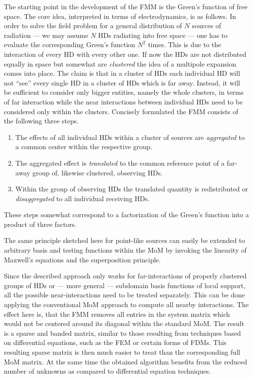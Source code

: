 The starting point in the development of the \ac{FMM} is the Green's function
of free space.
The core idea, interpreted in terms of electrodynamics, is as follows.
In order to solve the field problem for a general distribution of $N$ sources
of radiation --- we may assume $N$ \acp{HD} radiating into free space ---
one has to evaluate the corresponding Green's function $N^2$ times.
This is due to the interaction of every \ac{HD} with every other one.
If now the \acp{HD} are not distributed equally in space but somewhat are
\emph{clustered} the idea of a multipole expansion 
\cite[9.7]{Jackson2013} \cite[7.10]{vanBladel2007} comes into place.
The claim is that in a cluster of \acp{HD} each individual \ac{HD} will not
\enquote{see} every single \ac{HD} in a cluster of \acp{HD} which is far away.
Instead, it will be sufficient to consider only bigger entities, namely the
whole clusters, in terms of far interaction while the near interactions
between individual \acp{HD} need to be considered only within the clusters.
Concisely formulated the \ac{FMM} consists of the following three steps. 
\begin{enumerate}
	\item The effects of all individual \acp{HD} within a cluster of sources
	are \emph{aggregated} to a common center within the respective group. 
	\item The aggregated effect is \emph{translated} to the common reference
	point of a far-away group of, likewise clustered, observing \acp{HD}.
	\item Within the group of observing \acp{HD} the translated quantity is
	redistributed or \emph{disaggregated} to all individual receiving \acp{HD}.
\end{enumerate}

These steps somewhat correspond to a factorization of the Green's function
into a product of three factors.

The same principle sketched here for point-like sources can easily be extended
to arbitrary basis and testing functions within the \ac{MoM} by invoking
the linearity of Maxwell's equations and the superposition principle.

Since the described approach only works for far-interactions of properly
clustered groups of \acp{HD} or --- more general --- subdomain basis functions 
of local support, all the possible near-interactions need to be treated
separately.
This can be done applying the conventional \ac{MoM} approach to compute all
nearby interactions.
The effect here is, that the \ac{FMM} removes all entries in the system matrix
which would not be centered around its diagonal within the standard \ac{MoM}.
The result is a sparse and banded matrix, similar to those resulting from
techniques based on differential equations, such as the \ac{FEM} or certain
forms of \acp{FDM}.
This resulting sparse matrix is then much easier to treat than the corresponding
full \ac{MoM} matrix. At the same time the obtained algorithm benefits from the
reduced number of unknowns as compared to differential equation techniques.

